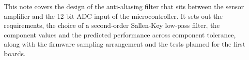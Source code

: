 
This note covers the design of the anti-aliasing filter that sits between the
sensor amplifier and the 12-bit ADC input of the microcontroller. It sets out
the requirements, the choice of a second-order Sallen-Key low-pass filter, the
component values and the predicted performance across component tolerance,
along with the firmware sampling arrangement and the tests planned for the
first boards.
